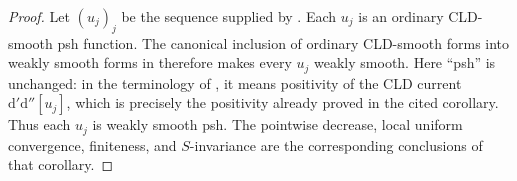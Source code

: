 \begin{proof}
Let \((u_j)_j\) be the sequence supplied by
.  Each \(u_j\) is
an ordinary CLD-smooth psh function.  The canonical inclusion of ordinary
CLD-smooth forms into weakly smooth forms in
\cite[Proposition~10.14]{GJR26} therefore makes every \(u_j\) weakly smooth.
Here ``psh'' is unchanged: in the terminology of \cite[\S7.13]{GJR26}, it
means positivity of the CLD current
\(\mathrm d'\mathrm d''[u_j]\), which is precisely the positivity already
proved in the cited corollary.  Thus each \(u_j\) is weakly smooth psh.
The pointwise decrease, local uniform convergence, finiteness, and
\(S\)-invariance are the corresponding conclusions of that corollary.
\end{proof}

